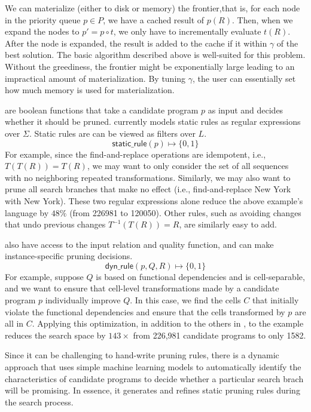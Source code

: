  We can materialize (either to disk or memory) the frontier,that is, for each node in the priority queue $p \in P$, we have a cached result of $p(R)$. 
 Then, when we expand the nodes to $p' = p \circ t$, we only have to incrementally evaluate $t(R)$.
 After the node is expanded, the result is added to the cache if it within $\gamma$ of the best solution.
 The basic algorithm described above is well-suited for this problem.
 Without the greediness, the frontier might be exponentially large leading to an impractical amount of materialization.
 By tuning $\gamma$, the user can essentially set how much memory is used for materialization.


 are boolean functions that take a candidate program $p$ as input and decides whether it should be pruned. \sys currently models static rules as regular expressions over $\Sigma$.  Static rules are can be viewed as filters over $L$.
\[\textsf{static\_rule}(p) \mapsto \{0,1\}\]
For example, since the find-and-replace operations are idempotent, i.e., $T(T(R)) = T(R)$, we may want to only consider the set of all sequences with no neighboring repeated transformations. Similarly, we may also want to prune all search branches that make no effect (i.e., find-and-replace New York with New York).
These two regular expressions alone reduce the above example's language by $48\%$ (from 226981 to 120050).
Other rules, such as avoiding changes that undo previous changes $T^{-1}(T(R)) = R$, are similarly easy to add.


 also have access to the input relation and quality function, and can make instance-specific pruning decisions.
\[\textsf{dyn\_rule}(p, Q, R) \mapsto \{0,1\}\]
For example, suppose  $Q$ is based on functional dependencies and is cell-separable, and we want to ensure that cell-level transformations made by a candidate program $p$ individually improve $Q$.  In this case, we find the cells $C$ that initially violate the functional dependencies and ensure that the cells transformed by $p$ are all in $C$.  Applying this optimization, in addition to the others in \sys, to the example reduces the search space by $143\times$ from 226,981 candidate programs to only 1582.  

Since it can be challenging to hand-write pruning rules, there is a dynamic approach that uses simple machine learning models to automatically identify the characteristics of candidate programs to decide whether a particular search brach will be promising.  In essence, it generates and refines static pruning rules during the search process.  

